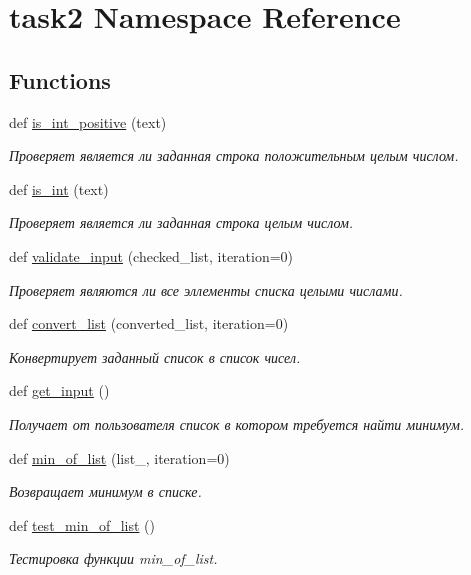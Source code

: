 \hypertarget{namespacetask2}{}\section{task2 Namespace Reference}
\label{namespacetask2}
\subsection*{Functions}
\begin{DoxyCompactItemize}
\item 
def \hyperlink{namespacetask2_a00e73ab7ff2d5b208bc90e1ed19cee68}{is\+\_\+int\+\_\+positive} (text)
\begin{DoxyCompactList}\small\item\em Проверяет является ли заданная строка положительным целым числом. \end{DoxyCompactList}\item 
def \hyperlink{namespacetask2_a01898c85ce38c2776909e1b5b13261e7}{is\+\_\+int} (text)
\begin{DoxyCompactList}\small\item\em Проверяет является ли заданная строка целым числом. \end{DoxyCompactList}\item 
def \hyperlink{namespacetask2_a3f18d2aefc4e2184c56e9832bcb27b88}{validate\+\_\+input} (checked\+\_\+list, iteration=0)
\begin{DoxyCompactList}\small\item\em Проверяет являются ли все эллементы списка целыми числами. \end{DoxyCompactList}\item 
def \hyperlink{namespacetask2_a1cc67c3848267075b4e68b63b9f85a86}{convert\+\_\+list} (converted\+\_\+list, iteration=0)
\begin{DoxyCompactList}\small\item\em Конвертирует заданный список в список чисел. \end{DoxyCompactList}\item 
def \hyperlink{namespacetask2_a748c12c01cd27c3dc6a6a90e35bbce97}{get\+\_\+input} ()
\begin{DoxyCompactList}\small\item\em Получает от пользователя список в котором требуется найти минимум. \end{DoxyCompactList}\item 
def \hyperlink{namespacetask2_a5eace687491dadb82911808fd7569efd}{min\+\_\+of\+\_\+list} (list\+\_\+, iteration=0)
\begin{DoxyCompactList}\small\item\em Возвращает минимум в списке. \end{DoxyCompactList}\item 
def \hyperlink{namespacetask2_a5ea140dcff089ff5c1e696f2fccf7a9f}{test\+\_\+min\+\_\+of\+\_\+list} ()
\begin{DoxyCompactList}\small\item\em Тестировка функции min\+\_\+of\+\_\+list. \end{DoxyCompactList}\end{DoxyCompactItemize}


